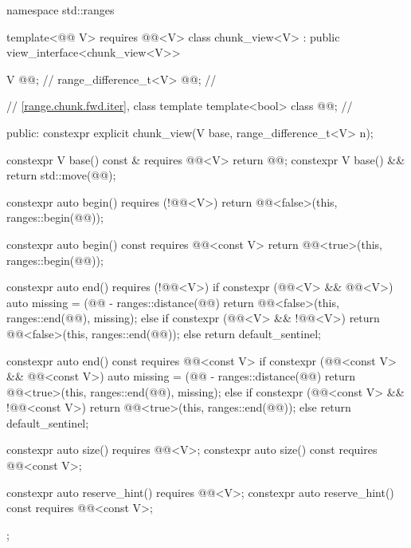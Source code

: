 %
%
%
\begin{codeblock}
namespace std::ranges {
  template<@@ V>
    requires @@<V>
  class chunk_view<V> : public view_interface<chunk_view<V>> {
    V @@;                            // \expos
    range_difference_t<V> @@;           // \expos

    // \ref{range.chunk.fwd.iter}, class template 
    template<bool> class @@;      // \expos

  public:
    constexpr explicit chunk_view(V base, range_difference_t<V> n);

    constexpr V base() const & requires @@<V> { return @@; }
    constexpr V base() && { return std::move(@@); }

    constexpr auto begin() requires (!@@<V>) {
      return @@<false>(this, ranges::begin(@@));
    }

    constexpr auto begin() const requires @@<const V> {
      return @@<true>(this, ranges::begin(@@));
    }

    constexpr auto end() requires (!@@<V>) {
      if constexpr (@@<V> && @@<V>) {
        auto missing = (@@ - ranges::distance(@@) %
        return @@<false>(this, ranges::end(@@), missing);
      } else if constexpr (@@<V> && !@@<V>) {
        return @@<false>(this, ranges::end(@@));
      } else {
        return default_sentinel;
      }
    }

    constexpr auto end() const requires @@<const V> {
      if constexpr (@@<const V> && @@<const V>) {
        auto missing = (@@ - ranges::distance(@@) %
        return @@<true>(this, ranges::end(@@), missing);
      } else if constexpr (@@<const V> && !@@<const V>) {
        return @@<true>(this, ranges::end(@@));
      } else {
        return default_sentinel;
      }
    }

    constexpr auto size() requires @@<V>;
    constexpr auto size() const requires @@<const V>;

    constexpr auto reserve_hint() requires @@<V>;
    constexpr auto reserve_hint() const requires @@<const V>;
  };
}
\end{codeblock}

